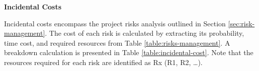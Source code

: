 \vspace{-10pt}

\textbf{Incidental Costs}
\vspace{-5pt}

Incidental costs encompass the project risks analysis outlined in Section \ref{sec:risk-management}. The cost of each risk is calculated by extracting its probability, time cost, and required resources from Table \ref{table:risks-management}. A breakdown calculation is presented in Table \ref{table:incidental-cost}. Note that the resources required for each risk are identified as Rx (R1, R2, …).

\vspace{-10pt}

\begin{table}[H]
    \renewcommand{\arraystretch}{1.2} 
    \centering
    \footnotesize
    \setlength{\tabcolsep}{3.5pt} 
    \normalsize 
    \caption[Incidental cost]
    {Incidental cost. [Own creation]} 
    \vspace{-1em}
    \label{table:incidental-cost}
\end{table}

\vspace{-10pt}



